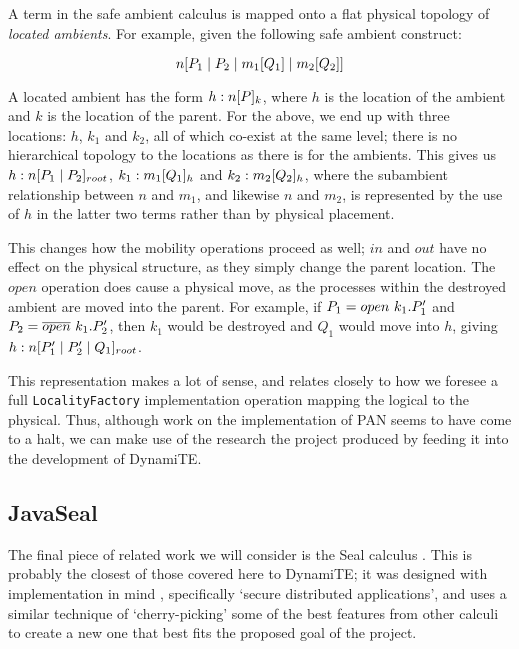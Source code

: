 A term in the safe ambient calculus is mapped onto a flat physical
topology of \emph{located ambients}.  For example, given the following
safe ambient construct:

\begin{equation}
{n}[ P_1 \;|\; P_2 \;|\; {m_1}[ Q_1 ] \;|\; {m_2}[ Q_2 ] ]
\end{equation}

A located ambient has the form ${h:n}[ P ]_{k}$, where $h$ is the
location of the ambient and $k$ is the location of the parent.  For
the above, we end up with three locations: $h$, $k_1$ and $k_2$, all
of which co-exist at the same level; there is no hierarchical topology
to the locations as there is for the ambients.  This gives us
${h:n}[ P_1 \;|\; P_2 ]_{root}$, ${k_1:m_1}[ Q_1 ]_{h}$ and
${k_2:m_2}[ Q_2 ]_{h}$, where the subambient relationship between
$n$ and $m_1$, and likewise $n$ and $m_2$, is represented by the use
of $h$ in the latter two terms rather than by physical placement.

This changes how the mobility operations proceed as well; $in$ and
$out$ have no effect on the physical structure, as they simply change
the parent location.  The $open$ operation does cause a physical move,
as the processes within the destroyed ambient are moved into the
parent.  For example, if $P_1 = open\ k_1.P_1'$ and $P_2 =
\overline{open}\ k_1.P_2'$, then $k_1$ would be destroyed and $Q_1$ would
move into $h$, giving ${h:n}[ P_1' \;|\; P_2' \;|\; Q_1 ]_{root}$.

This representation makes a lot of sense, and relates closely to how
we foresee a full \texttt{LocalityFactory} implementation operation
mapping the logical to the physical.  Thus, although work on the
implementation of PAN seems to have come to a halt, we can make use of
the research the project produced by feeding it into the development
of DynamiTE.

\subsection{JavaSeal}

The final piece of related work we will consider is the Seal calculus
\cite{seal}.  This is probably the closest of those covered here to
DynamiTE; it was designed with implementation in mind \cite{javaseal},
specifically `secure distributed applications', and uses a similar
technique of `cherry-picking' some of the best features from other
calculi to create a new one that best fits the proposed goal of the
project.


